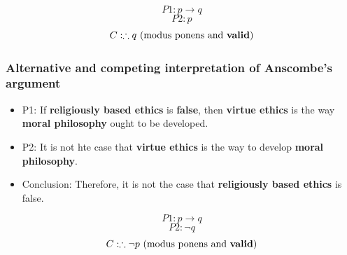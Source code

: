 \documentclass[11pt]{article}
\begin{document}
\[P1: p \rightarrow q\]
\[P2: p\]
\[C: \therefore q \ (\text{modus ponens and \textbf{valid}})\]
\subsubsection{Alternative and competing interpretation of Anscombe's argument}
\label{sec:orge49e784}
\begin{itemize}
\item P1: If \textbf{religiously based ethics} is \textbf{false}, then \textbf{virtue ethics} is the way \textbf{moral philosophy} ought to be developed.
\item P2: It is not hte case that \textbf{virtue ethics} is the way to develop \textbf{moral philosophy}.
\item Conclusion: Therefore, it is not the case that \textbf{religiously based ethics} is false.
\end{itemize}

\[P1: p \rightarrow q\]
\[P2: \neg q\]
\[C: \therefore \neg p \ (\text{modus ponens and \textbf{valid}})\]

 \newpage
\end{document}

